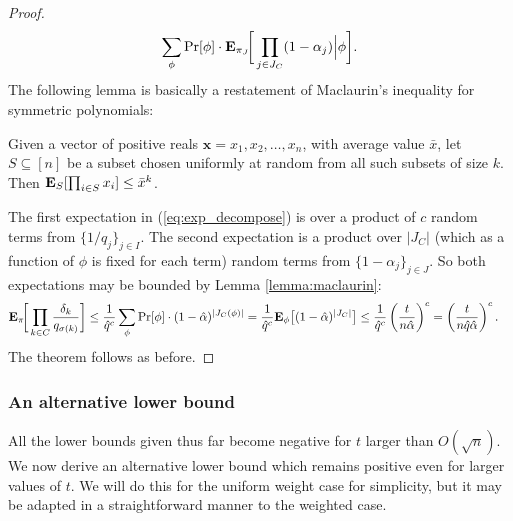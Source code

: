 \begin{proof}
\begin{align}
\sum_{\phi}\Pr[\phi]\cdot\text{\bf E}_{\pi_J}\hspace{-2pt}\bigg[ \prod_{j\in J_C}(1-\alpha_j)\Big\vert \phi\bigg].\label{eq:exp_decompose} 
\end{align}
The following lemma is basically a restatement of Maclaurin's inequality for symmetric polynomials:
\begin{lemma}\label{lemma:maclaurin}
Given a vector of positive reals $\mathbf{x}=x_1,x_2,\ldots,x_n$, with average value $\bar x$, let $S\subseteq[n]$ be a subset chosen uniformly at random from all such subsets of size $k$. Then $\text{\bf E}_S[\prod_{i\in S} x_i]\le {\bar x}^k$.
\end{lemma}
The first expectation in (\ref{eq:exp_decompose}) is over a product of $c$ random terms from $\{1/q_j\}_{j\in I}$. The second expectation is a product over $|J_C|$ (which as a function of $\phi$ is fixed for each term) random terms from $\{1-\alpha_j\}_{j\in J}$. So both expectations may be bounded by Lemma \ref{lemma:maclaurin}:
\begin{align*} 
\text{\bf E}_\pi\hspace{-2pt}\bigg[ \prod_{k\in C} \frac{\delta_k}{q_{\sigma(k)}} \bigg] 
&\le \frac{1}{\hat q^c}
\sum_{\phi}\Pr[\phi]\cdot (1-\hat\alpha)^{|J_C(\phi)|}
=\frac{1}{\hat q^c}\text{\bf E}_\phi\big[(1-\hat\alpha)^{|J_C|}\big]
\le\frac{1}{\hat q^c}\left(\frac{t}{n\hat\alpha}\right)^c
=\left(\frac{t}{n\hat q\hat\alpha}\right)^c.
\end{align*}
The theorem follows as before.
\end{proof}

\subsubsection{An alternative lower bound}
All the lower bounds given thus far become negative for $t$ larger than $O(\sqrt{n})$. We now derive an alternative lower bound which remains positive even for larger values of $t$. We will do this for the uniform weight case for simplicity, but it may be adapted in a straightforward manner to the weighted case. 

